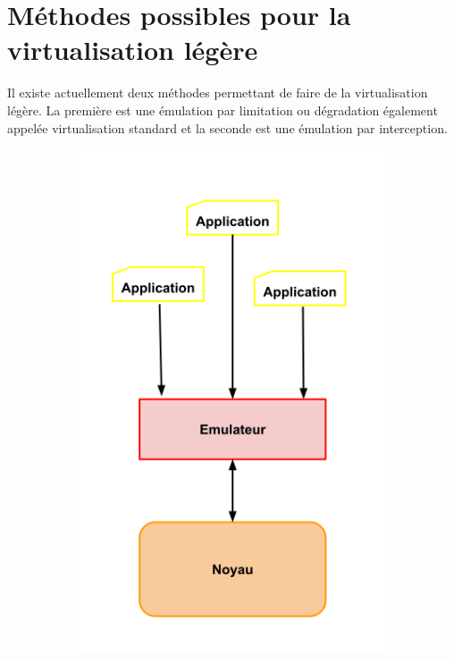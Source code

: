 \section{Méthodes possibles pour la virtualisation légère}
\label{section:emulation}

Il existe actuellement deux méthodes permettant de faire de la virtualisation
légère. La première est une émulation par limitation ou dégradation également
appelée virtualisation standard et la seconde est une émulation par
interception.

\begin{figure}[H]
  \centering
  \begin{subfigure}{0.3\textwidth}
    \includegraphics[scale=0.35]{Pictures/png/Virtualisation_limitation}
  \end{subfigure}
  \begin{subfigure}{0.3\textwidth}

\end{subfigure}
\end{figure}

